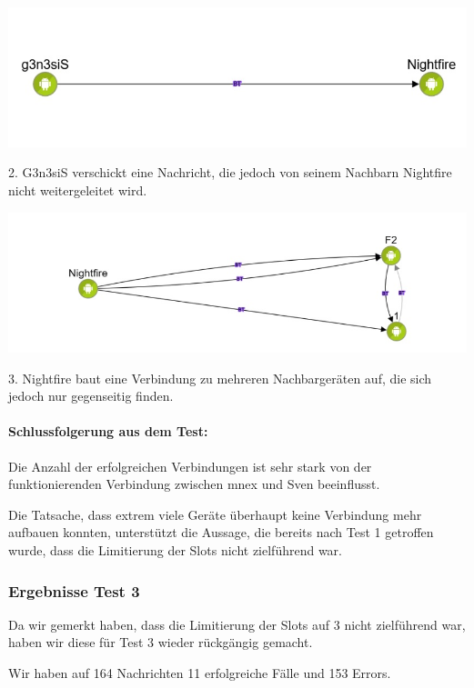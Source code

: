 \includegraphics[width=1.0\textwidth]{belege/grosstests/Bilder/Grosstest2/Test2Misserfolg2.jpg}

2. G3n3siS verschickt eine Nachricht, die jedoch von seinem Nachbarn
Nightfire nicht weitergeleitet wird.

\includegraphics[width=1.0\textwidth]{belege/grosstests/Bilder/Grosstest2/Test2Misserfolg3.jpg}

3. Nightfire baut eine Verbindung zu mehreren Nachbargeräten auf, die sich
jedoch nur gegenseitig finden.

\paragraph{Schlussfolgerung aus dem Test:}

Die Anzahl der erfolgreichen Verbindungen ist sehr stark von der
funktionierenden Verbindung zwischen mnex und Sven beeinflusst.

Die Tatsache, dass extrem viele Geräte überhaupt keine Verbindung mehr
aufbauen konnten, unterstützt die Aussage, die bereits nach Test 1
getroffen wurde, dass die Limitierung der Slots nicht zielführend war.


\subsubsection{Ergebnisse Test 3}

Da wir gemerkt haben, dass die Limitierung der Slots auf 3 nicht
zielführend war, haben wir diese für Test 3 wieder rückgängig gemacht.

Wir haben auf 164 Nachrichten 11 erfolgreiche Fälle und 153 Errors.

